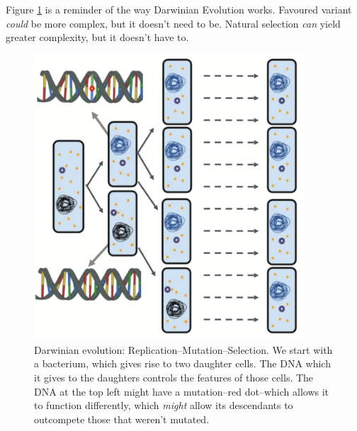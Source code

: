 \documentclass[]{article}
\begin{document}
Figure \ref{fig:ReplicationMutationSelection} is a reminder of the way Darwinian Evolution works. Favoured variant \textit{could} be more complex, but it doesn't need to be. Natural selection \emph{can} yield greater complexity, but it doesn't have to.
\begin{figure}[H]
	\caption[Darwinian evolution: Replication--Mutation--Selection]{Darwinian evolution: Replication--Mutation--Selection. We start with a bacterium, which gives rise to two daughter cells. The DNA which it gives to the daughters controls the features of those cells. The DNA at the top left might have a mutation--red dot--which allows it to function differently, which \emph{might} allow its descendants to outcompete those that weren't mutated.}\label{fig:ReplicationMutationSelection}
	\includegraphics[width=0.9\textwidth]{ReplicationMutationSelection}
\end{figure}
\end{document}
